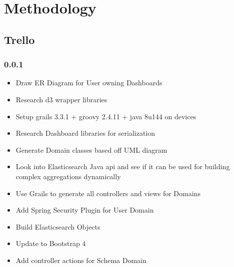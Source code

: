 \documentclass[12pt]{report}
\begin{document}
\chapter{Methodology}
\section{Trello}\subsection{0.0.1}
\begin{itemize}
\item Draw ER Diagram for User owning Dashboards
\item Research d3 wrapper libraries
\item Setup grails 3.3.1 + groovy 2.4.11 + java 8u144 on devices
\item Research Dashboard libraries for serialization
\item Generate Domain classes based off UML diagram
\item Look into Elasticsearch Java api and see if it can be used for building complex aggregations dynamically
\item Use Grails to generate all controllers and views for Domains
\item Add Spring Security Plugin for User Domain
\item Build Elasticsearch Objects
\item Update to Bootstrap 4
\item Add controller actions for Schema Domain
\end{itemize}
\end{document}
